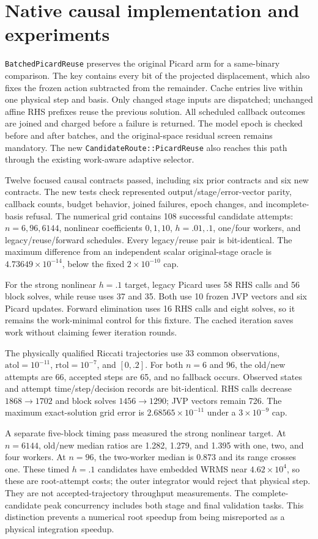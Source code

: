 \documentclass[aps,pra,reprint,onecolumn,12pt,notitlepage,superscriptaddress,nofootinbib]{revtex4-2}
\begin{document}
\section{Native causal implementation and experiments}
\texttt{BatchedPicardReuse} preserves the original Picard arm for a same-binary
comparison. The key contains every bit of the projected displacement,
which also fixes the frozen action subtracted from the remainder. Cache
entries live within one physical step and basis. Only changed stage inputs
are dispatched; unchanged affine RHS prefixes reuse the previous solution.
All scheduled callback outcomes are joined and charged before a failure is
returned. The model epoch is checked before and after batches, and the
original-space residual screen remains mandatory. The new
\texttt{CandidateRoute::PicardReuse} also reaches this path through the
existing work-aware adaptive selector.

Twelve focused causal contracts passed, including six prior contracts and
six new contracts. The new tests check represented output/stage/error-vector
parity, callback counts, budget behavior, joined failures, epoch changes,
and incomplete-basis refusal. The numerical grid contains 108 successful
candidate attempts: $n=6,96,6144$, nonlinear coefficients $0,1,10$,
$h=.01,.1$, one/four workers, and legacy/reuse/forward schedules. Every
legacy/reuse pair is bit-identical. The maximum difference from an
independent scalar original-stage oracle is $4.73649\times10^{-14}$,
below the fixed $2\times10^{-10}$ cap.

For the strong nonlinear $h=.1$ target, legacy Picard uses 58 RHS calls and
56 block solves, while reuse uses 37 and 35. Both use 10 frozen JVP vectors
and six Picard updates. Forward elimination uses 16 RHS calls and eight
solves, so it remains the work-minimal control for this fixture.
The cached iteration saves work without claiming fewer iteration rounds.

The physically qualified Riccati trajectories use 33 common observations,
$\mathrm{atol}=10^{-11}$, $\mathrm{rtol}=10^{-7}$, and $[0,.2]$.
For both $n=6$ and 96, the old/new attempts are 66, accepted steps are 65,
and no fallback occurs. Observed states and attempt time/step/decision
records are bit-identical. RHS calls decrease $1868\to1702$ and block
solves $1456\to1290$; JVP vectors remain 726. The maximum exact-solution
grid error is $2.68565\times10^{-11}$ under a $3\times10^{-9}$ cap.

A separate five-block timing pass measured the strong nonlinear target.
At $n=6144$, old/new median ratios are 1.282, 1.279, and 1.395 with one,
two, and four workers. At $n=96$, the two-worker median is 0.873 and its
range crosses one. These timed $h=.1$ candidates have embedded WRMS near
$4.62\times10^4$, so these are root-attempt costs; the outer integrator
would reject that physical step. They are not accepted-trajectory
throughput measurements. The complete-candidate peak concurrency includes
both stage and final validation tasks. This distinction prevents a numerical
root speedup from being misreported as a physical integration speedup.
\end{document}
